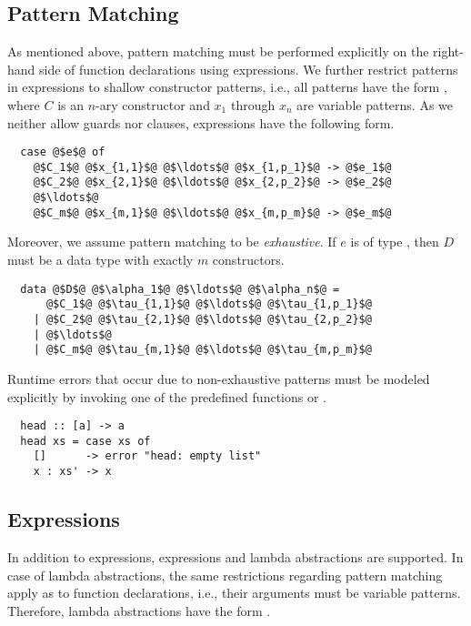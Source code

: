 \subsection{Pattern Matching} \label{sec:preliminaries:assumptions:pattern-matching}
As mentioned above, pattern matching must be performed explicitly on the right-hand side of function declarations using  expressions.
We further restrict patterns in  expressions to shallow constructor patterns, i.e., all patterns have the form , where $C$ is an $n$-ary constructor and $x_1$ through $x_n$ are variable patterns.
As we neither allow guards nor  clauses,  expressions have the following form.
\begin{verbatim}
  case @$e$@ of
    @$C_1$@ @$x_{1,1}$@ @$\ldots$@ @$x_{1,p_1}$@ -> @$e_1$@
    @$C_2$@ @$x_{2,1}$@ @$\ldots$@ @$x_{2,p_2}$@ -> @$e_2$@
    @$\ldots$@
    @$C_m$@ @$x_{m,1}$@ @$\ldots$@ @$x_{m,p_m}$@ -> @$e_m$@
\end{verbatim}
Moreover, we assume pattern matching to be \textit{exhaustive}.
If $e$ is of type , then $D$ must be a data type with exactly $m$ constructors.
\begin{verbatim}
  data @$D$@ @$\alpha_1$@ @$\ldots$@ @$\alpha_n$@ =
      @$C_1$@ @$\tau_{1,1}$@ @$\ldots$@ @$\tau_{1,p_1}$@
    | @$C_2$@ @$\tau_{2,1}$@ @$\ldots$@ @$\tau_{2,p_2}$@
    | @$\ldots$@
    | @$C_m$@ @$\tau_{m,1}$@ @$\ldots$@ @$\tau_{m,p_m}$@
\end{verbatim}
Runtime errors that occur due to non-exhaustive patterns must be modeled explicitly by invoking one of the predefined functions  or .
\begin{verbatim}
  head :: [a] -> a
  head xs = case xs of
    []      -> error "head: empty list"
    x : xs' -> x
\end{verbatim}

\subsection{Expressions}
In addition to  expressions,  expressions and lambda abstractions are supported.
In case of lambda abstractions, the same restrictions regarding pattern matching apply as to function declarations, i.e., their arguments must be variable patterns.
Therefore, lambda abstractions have the form .


